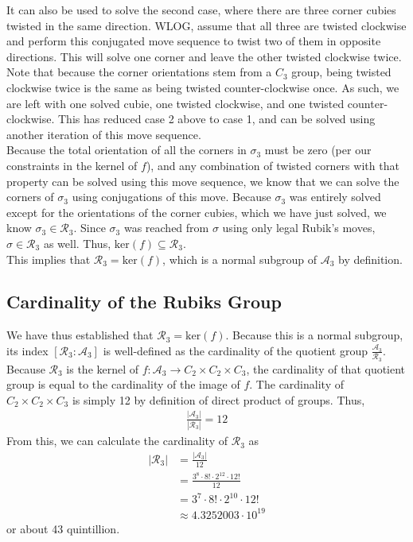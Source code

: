 \documentclass[10pt,letterpaper]{report}
\begin{document}
It can also be used to solve the second case, where there are three corner cubies twisted in the same direction.  WLOG, assume that all three are twisted clockwise and perform this conjugated move sequence to twist two of them in opposite directions.  This will solve one corner and leave the other twisted clockwise twice.  Note that because the corner orientations stem from a $C_3$  group, being twisted clockwise twice is the same as being twisted counter-clockwise once.  As such, we are left with one solved cubie, one twisted clockwise, and one twisted counter-clockwise.  This has reduced case 2 above to case 1, and can be solved using another iteration of this move sequence.  \\

Because the total orientation of all the corners in $\sigma_3$ must be zero (per our constraints in the kernel of $f$), and any combination of twisted corners with that property can be solved using this move sequence, we know that we can solve the corners of $\sigma_3$ using conjugations of this move.  Because $\sigma_3$ was entirely solved except for the orientations of the corner cubies, which we have just solved, we know $\sigma_3 \in \mathcal{R}_3$.  Since $\sigma_3$ was reached from $\sigma$ using only legal Rubik's moves, $\sigma \in \mathcal{R}_3$ as well.  Thus, $\text{ker}(f) \subseteq \mathcal{R}_3$. \\

This implies that $\mathcal{R}_3 = \text{ker}(f)$, which is a normal subgroup of $\mathcal{A}_3$ by definition.

\subsection{Cardinality of the Rubiks Group}

We have thus established that $\mathcal{R}_3 = \text{ker}(f)$.  Because this is a normal subgroup, its index $[\mathcal{R}_3 : \mathcal{A}_3]$ is well-defined as the cardinality of the quotient group $\frac{\mathcal{A}_3}{\mathcal{R}_3}$.  Because $\mathcal{R}_3$ is the kernel of $f: \mathcal{A}_3 \rightarrow C_2 \times C_2 \times C_3$, the cardinality of that quotient group is equal to the cardinality of the image of $f$.  The cardinality of $C_2 \times C_2 \times C_3$ is simply 12 by definition of direct product of groups.  Thus, \begin{align*}
\frac{|\mathcal{A}_3|}{|\mathcal{R}_3|} = 12
\end{align*}
From this, we can calculate the cardinality of $\mathcal{R}_3$ as \begin{align*}
|\mathcal{R}_3|
&= \frac{|\mathcal{A}_3|}{12} \\
&= \frac{3^8 \cdot 8! \cdot 2^{12} \cdot 12!}{12} \\
&= 3^7 \cdot 8! \cdot 2^{10} \cdot 12! \\
&\approx 4.3252003 \cdot 10^{19}
\end{align*}
or about 43 quintillion.
\end{document}
